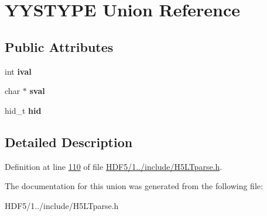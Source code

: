 \hypertarget{union_y_y_s_t_y_p_e}{}\section{Y\+Y\+S\+T\+Y\+PE Union Reference}
\label{union_y_y_s_t_y_p_e}
\subsection*{Public Attributes}
\begin{DoxyCompactItemize}
\item 
\mbox{\label{union_y_y_s_t_y_p_e_ae9d3f6cba410d8f367f34437acf8c9a2}} 
int {\bfseries ival}
\item 
\mbox{\label{union_y_y_s_t_y_p_e_a73a5074a72319891e5442106deeb667b}} 
char $\ast$ {\bfseries sval}
\item 
\mbox{\label{union_y_y_s_t_y_p_e_a793976b2d7b956f1e6acfa2f0a543208}} 
hid\+\_\+t {\bfseries hid}
\end{DoxyCompactItemize}


\subsection{Detailed Description}


Definition at line \hyperlink{_h_d_f5_21_810_81_2include_2_h5_l_tparse_8h_source_l00110}{110} of file \hyperlink{_h_d_f5_21_810_81_2include_2_h5_l_tparse_8h_source}{H\+D\+F5/1../include/\+H5\+L\+Tparse.\+h}.



The documentation for this union was generated from the following file\+:\begin{DoxyCompactItemize}
\item 
H\+D\+F5/1../include/\+H5\+L\+Tparse.\+h\end{DoxyCompactItemize}
